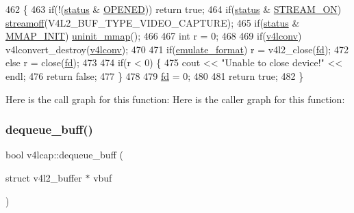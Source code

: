 \begin{DoxyCode}
462                           \{
463     \textcolor{keywordflow}{if}(!(\hyperlink{classv4lcap_ae90192b024d952b464408e0ffd95d90a}{status} & \hyperlink{classv4lcap_a54af28c37f6a06c466390050290b8a5fa4015ad97149ce726bbc1843cb9527972}{OPENED})) \textcolor{keywordflow}{return} \textcolor{keyword}{true};
464     \textcolor{keywordflow}{if}(\hyperlink{classv4lcap_ae90192b024d952b464408e0ffd95d90a}{status} & \hyperlink{classv4lcap_a54af28c37f6a06c466390050290b8a5fa50f1c16a61587c54c5bf5f95b3802625}{STREAM\_ON}) \hyperlink{classv4lcap_ae15aa5107e993df45eb358a842d97e55}{streamoff}(V4L2\_BUF\_TYPE\_VIDEO\_CAPTURE);
465     \textcolor{keywordflow}{if}(\hyperlink{classv4lcap_ae90192b024d952b464408e0ffd95d90a}{status} & \hyperlink{classv4lcap_a54af28c37f6a06c466390050290b8a5fa13fe1706c834cc277398a59fa0722bdb}{MMAP\_INIT}) \hyperlink{classv4lcap_aafab5fd381c1d5858cd87f42560a40ab}{uninit\_mmap}();
466 
467     \textcolor{keywordtype}{int} r = 0;
468 
469     \textcolor{keywordflow}{if}(\hyperlink{classv4lcap_a5e57bbf84383d7b42d0cc9d1e7e03abb}{v4lconv}) v4lconvert\_destroy(\hyperlink{classv4lcap_a5e57bbf84383d7b42d0cc9d1e7e03abb}{v4lconv});
470 
471     \textcolor{keywordflow}{if}(\hyperlink{classv4lcap_a21b4c152f56ecc309a490cb8ab4ce117}{emulate\_format}) r = v4l2\_close(\hyperlink{classv4lcap_a38109593bde997dad13b3a461569573d}{fd});
472     \textcolor{keywordflow}{else} r = close(\hyperlink{classv4lcap_a38109593bde997dad13b3a461569573d}{fd});
473 
474     \textcolor{keywordflow}{if}(r < 0) \{
475         cout << \textcolor{stringliteral}{"Unable to close device!"} << endl;
476         \textcolor{keywordflow}{return} \textcolor{keyword}{false};
477     \}
478 
479     \hyperlink{classv4lcap_a38109593bde997dad13b3a461569573d}{fd} = 0;
480 
481     \textcolor{keywordflow}{return} \textcolor{keyword}{true};
482 \}
\end{DoxyCode}
Here is the call graph for this function\+:
Here is the caller graph for this function\+:
\mbox{\label{classv4lcap_a73678c131c1ac6c555be3ea125be08da}} 
\subsubsection{\texorpdfstring{dequeue\+\_\+buff()}{dequeue\_buff()}\hspace{0.1cm}{\footnotesize\ttfamily [1/3]}}
{\footnotesize\ttfamily bool v4lcap\+::dequeue\+\_\+buff (\begin{DoxyParamCaption}\item[{struct v4l2\+\_\+buffer $\ast$}]{vbuf }\end{DoxyParamCaption})}



